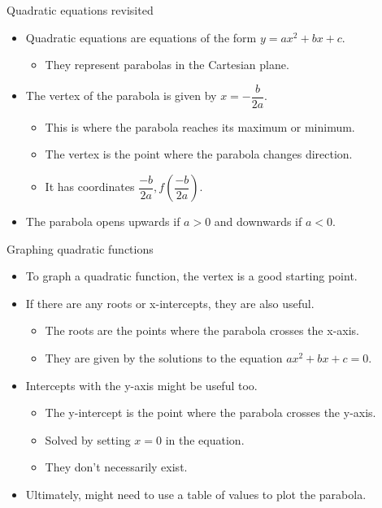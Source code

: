 \documentclass[
  10pt,
  ignorenonframetext,
]{beamer}
\providecommand{\tightlist}{%
  \setlength{\itemsep}{0pt}\setlength{\parskip}{0pt}}\usepackage{longtable,booktabs,array}
\begin{document}
\begin{frame}{Quadratic equations revisited}
\label{quadratic-equations-revisited}
\begin{itemize}
\tightlist
\item
  Quadratic equations are equations of the form \(y = ax^2 + bx + c\).

  \begin{itemize}
  \tightlist
  \item
    They represent parabolas in the Cartesian plane.
  \end{itemize}
\item
  The vertex of the parabola is given by \(x = -\dfrac{b}{2a}\).

  \begin{itemize}
  \tightlist
  \item
    This is where the parabola reaches its maximum or minimum.
  \item
    The vertex is the point where the parabola changes direction.
  \item
    It has coordinates \(\dfrac{-b}{2a}, f\left(\dfrac{-b}{2a}\right)\).
  \end{itemize}
\item
  The parabola opens upwards if \(a > 0\) and downwards if \(a < 0\).
\end{itemize}
\end{frame}

\begin{frame}{Graphing quadratic functions}
\label{graphing-quadratic-functions}
\begin{itemize}
\item
  To graph a quadratic function, the vertex is a good starting point.
\item
  If there are any roots or x-intercepts, they are also useful.

  \begin{itemize}
  \tightlist
  \item
    The roots are the points where the parabola crosses the x-axis.
  \item
    They are given by the solutions to the equation
    \(ax^2 + bx + c = 0\).
  \end{itemize}
\item
  Intercepts with the y-axis might be useful too.

  \begin{itemize}
  \tightlist
  \item
    The y-intercept is the point where the parabola crosses the y-axis.
  \item
    Solved by setting \(x = 0\) in the equation.
  \item
    They don't necessarily exist.
  \end{itemize}
\item
  Ultimately, might need to use a table of values to plot the parabola.
\end{itemize}
\end{frame}
\end{document}
